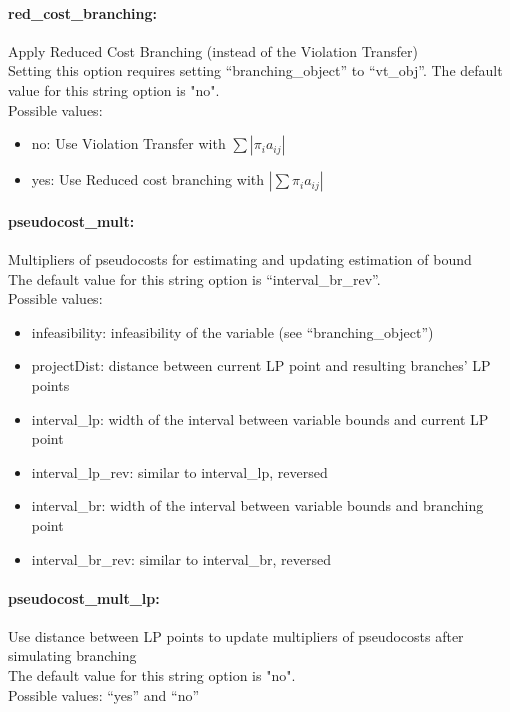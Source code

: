 \paragraph{red\_cost\_branching:}\label{sec:red_cost_branching} Apply Reduced Cost Branching (instead of the Violation Transfer) $\;$ \\
Setting this option requires setting ``branching\_object'' to ``vt\_obj''.
The default value for this string option is "no".\\ 
Possible values:
\begin{itemize}
   \item no: Use Violation Transfer with $\sum |\pi_i a_{ij}|$
   \item yes: Use Reduced cost branching with $|\sum \pi_i a_{ij}|$
\end{itemize}

\paragraph{pseudocost\_mult:}\label{sec:pseudocost_mult} Multipliers of pseudocosts for estimating and updating estimation of bound $\;$ \\
The default value for this string option is ``interval\_br\_rev''. \\
Possible values:
\begin{itemize}
   \item infeasibility: infeasibility of the variable (see ``branching\_object'')
   \item projectDist: distance between current LP point and resulting branches' LP points
   \item interval\_lp: width of the interval between variable bounds and current LP point
   \item interval\_lp\_rev: similar to interval\_lp, reversed
   \item interval\_br: width of the interval between variable bounds and branching point
   \item interval\_br\_rev: similar to interval\_br, reversed
\end{itemize}

\paragraph{pseudocost\_mult\_lp:}\label{sec:pseudocost_mult_lp} Use distance between LP points to update multipliers of pseudocosts after simulating branching $\;$ \\
The default value for this string option is "no". \\
Possible values: ``yes'' and ``no''

